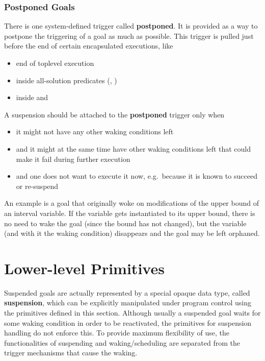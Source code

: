 \subsubsection{Postponed Goals}
There is one system-defined trigger called {\bf postponed}.
It is provided as a way to postpone the triggering of a goal as much
as possible. This trigger is pulled just before the end of
certain encapsulated executions, like
\begin{itemize}
\item end of toplevel execution
\item inside all-solution predicates (, )
\item inside  and 
\end{itemize}
A suspension should be attached to the {\bf postponed} trigger only when
\begin{itemize}
\item it might not have any other waking conditions left
\item and it might at the same time have other waking conditions left
        that could make it fail during further execution
\item and one does not want to execute it now, e.g.\ because it is known
        to succeed or re-suspend
\end{itemize}
An example is a goal that originally woke on modifications of the upper
bound of an interval variable. If the variable gets instantiated to its
upper bound, there is no need to wake the goal (since the bound has not
changed), but the variable (and with it the waking condition) disappears
and the goal may be left orphaned.




\section{Lower-level Primitives}

Suspended goals are actually represented by a special
opaque data type, called {\bf suspension}, which can be explicitly
manipulated under program control using the primitives defined in
this section.
Although usually a suspended goal waits for some waking condition
in order to be reactivated, the primitives for suspension handling
do not enforce this. To provide maximum flexibility of use,
the functionalities of suspending and waking/scheduling are
separated from the trigger mechanisms that cause the waking. 


